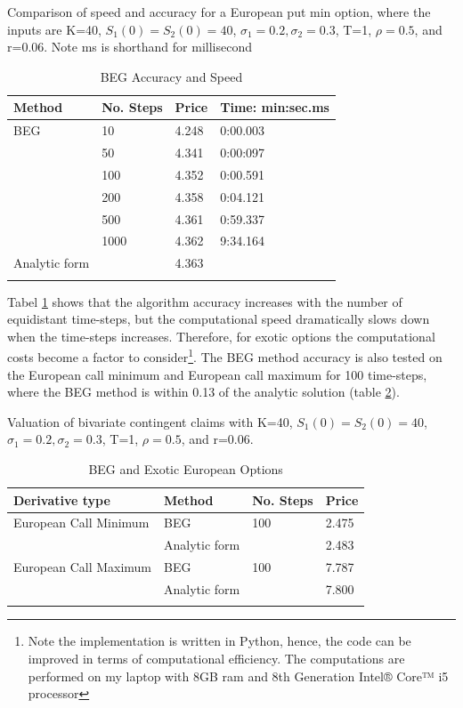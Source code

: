 \begin{table}[th]
\caption{BEG Accuracy and Speed}{Comparison of speed and accuracy for a European put min option, where the inputs are K=40, $S_1(0)=S_2(0)=40$, $\sigma_1=0.2, \sigma_2=0.3$, T=1, $\rho=0.5$,  and r=0.06. Note ms is shorthand for millisecond}
\label{tab:TradeOffEuroMin}
\centering
\begin{tabular}{l l l l}
\toprule
\textbf{Method} & \textbf{No. Steps} & \textbf{Price} & \textbf{Time: min:sec.ms} \\
\midrule
BEG & 10 & 4.248 & 0:00.003\\
& 50 & 4.341 & 0:00:097\\
& 100 & 4.352 & 0:00.591\\
& 200 & 4.358 & 0:04.121\\
& 500 & 4.361 & 0:59.337\\
& 1000 & 4.362 & 9:34.164\\
Analytic form & & 4.363 & \\
\bottomrule\\
\end{tabular}
\end{table}
Tabel \ref{tab:TradeOffEuroMin} shows that the algorithm accuracy increases with the number of equidistant time-steps, but the computational speed dramatically slows down when the time-steps increases. Therefore, for exotic options the computational costs become a factor to consider\footnote{Note the implementation is written in Python, hence, the code can be improved in terms of computational efficiency. The computations are performed on my laptop with 8GB ram and 8th Generation Intel® Core™ i5 processor}. The BEG method accuracy is also tested on the European call minimum and European call maximum for 100 time-steps, where the BEG method is within 0.13 of the analytic solution (table \ref{tab:PriceEuropean}).\\
\begin{table}[th]
\caption{BEG and Exotic European Options}{Valuation of bivariate contingent claims with K=40, $S_1(0)=S_2(0)=40$, $\sigma_1=0.2, \sigma_2=0.3$, T=1, $\rho=0.5$,  and r=0.06.}
\label{tab:PriceEuropean}
\centering
\begin{tabular}{l l l l}
\toprule
\textbf{Derivative type} & \textbf{Method} & \textbf{No. Steps} & \textbf{Price} \\
\midrule
European Call Minimum & BEG & 100 & 2.475\\
& Analytic form & & 2.483\\
European Call Maximum & BEG & 100 & 7.787\\
& Analytic form & & 7.800\\
\bottomrule\\
\end{tabular}
\end{table}
 
